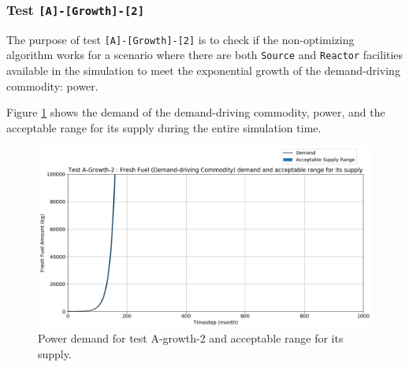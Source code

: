 \documentclass[11pt,letterpaper]{article}
\begin{document}
\subsubsection{Test \texttt{[A]-[Growth]-[2]}}
The purpose of test \texttt{[A]-[Growth]-[2]} is to check if the non-optimizing algorithm works for a scenario where there are both \texttt{Source} and \texttt{Reactor} facilities available in the simulation to meet the exponential growth of the demand-driving commodity: power. 

Figure \ref{fig:test-a-growth-2-demand} shows the demand of the demand-driving commodity, power, and the acceptable range for its supply during the entire simulation time.  

\begin{figure}[H]
	\begin{center}
		\includegraphics[scale=0.4]{./figures/demand_supply_A-Growth-2.png}
	\end{center}
        \caption{Power demand for test A-growth-2 and acceptable range for its supply.}
	\label{fig:test-a-growth-2-demand}
\end{figure}
\end{document}
